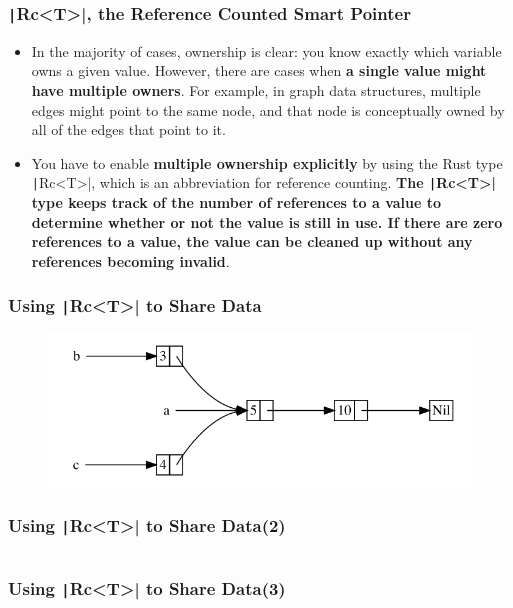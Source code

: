 \documentclass{beamer}
\begin{document}
\begin{frame}[fragile]
	\frametitle{\texttt|Rc<T>|, the Reference Counted Smart Pointer}
	\begin{itemize}
		\item In the majority of cases, ownership is clear: you know exactly which variable owns a given value. However, there are cases when\textbf{ a single value might have multiple owners}. For example, in graph data structures, multiple edges might point to the same node, and that node is conceptually owned by all of the edges that point to it. 
		\item 	You have to enable \textbf{multiple ownership explicitly }by using the Rust type \texttt|Rc<T>|, which is an abbreviation for reference counting. \textbf{The \texttt|Rc<T>| type keeps track of the number of references to a value to determine whether or not the value is still in use. If there are zero references to a value, the value can be cleaned up without any references becoming invalid}.
	\end{itemize}
\end{frame} 


\begin{frame}[fragile]
	\frametitle{Using \texttt|Rc<T>| to Share Data}
	\begin{figure}
		\centering
		\includegraphics[width=0.99\linewidth]{img/graph}
	\end{figure}
	
\end{frame} 


\begin{frame}[fragile]
	\frametitle{Using \texttt|Rc<T>| to Share Data(2)}
	\inputminted{rust}{./code/smart8.rs}
	
\end{frame} 

\begin{frame}[fragile]
	\frametitle{Using \texttt|Rc<T>| to Share Data(3)}
	\inputminted{shell}{./code/smart8.shell}
	
\end{frame} 
\end{document}
